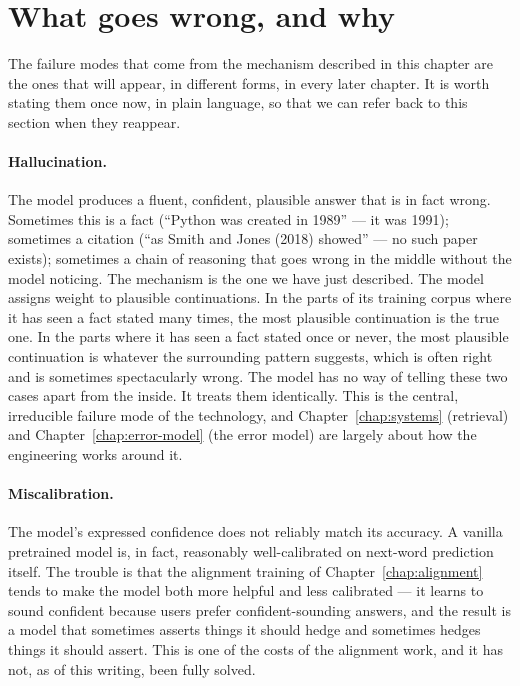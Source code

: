 \section{What goes wrong, and why}

The failure modes that come from the mechanism described in this
chapter are the ones that will appear, in different forms, in
every later chapter. It is worth stating them once now, in
plain language, so that we can refer back to this section when
they reappear.

\paragraph{Hallucination.} The model produces a fluent,
confident, plausible answer that is in fact wrong. Sometimes
this is a fact (``Python was created in 1989'' --- it was 1991);
sometimes a citation (``as Smith and Jones (2018) showed'' ---
no such paper exists); sometimes a chain of reasoning that goes
wrong in the middle without the model noticing. The mechanism
is the one we have just described. The model assigns weight to
plausible continuations. In the parts of its training corpus
where it has seen a fact stated many times, the most plausible
continuation is the true one. In the parts where it has seen a
fact stated once or never, the most plausible continuation is
whatever the surrounding pattern suggests, which is often
right and is sometimes spectacularly wrong. The model has no
way of telling these two cases apart from the inside. It treats
them identically. This is the central, irreducible failure mode
of the technology, and Chapter~\ref{chap:systems} (retrieval) and Chapter~\ref{chap:error-model}
(the error model) are largely about how the engineering works
around it.

\paragraph{Miscalibration.} The model's expressed confidence
does not reliably match its accuracy. A vanilla pretrained
model is, in fact, reasonably well-calibrated on next-word
prediction itself. The trouble is that the alignment training
of Chapter~\ref{chap:alignment} tends to make the model both more helpful and less
calibrated --- it learns to sound confident because users
prefer confident-sounding answers, and the result is a model
that sometimes asserts things it should hedge and sometimes
hedges things it should assert. This is one of the costs of
the alignment work, and it has not, as of this writing, been
fully solved.

